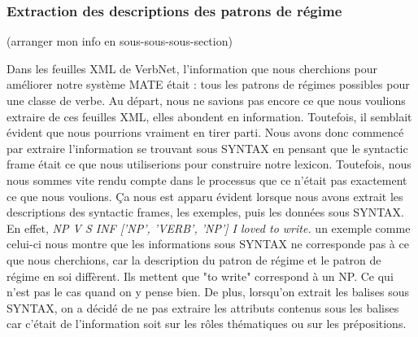 \documentclass[12pt,maitrise,frenchb,natbib,twoside,initial]{dms}
\numberwithin{equation}{section}
\numberwithin{table}{chapter}
\numberwithin{figure}{chapter}
\begin{document}
\subsubsection{Extraction des descriptions des  patrons de régime}

(arranger mon info en sous-sous-sous-section)

Dans les feuilles XML de VerbNet, l'information que nous cherchions pour améliorer notre système MATE était : tous les patrons de régimes possibles pour une classe de verbe. Au départ, nous ne savions pas encore ce que nous voulions extraire de ces feuilles XML, elles abondent en information. Toutefois, il semblait évident que nous pourrions vraiment en tirer parti. Nous avons donc commencé par extraire l'information se trouvant sous SYNTAX en pensant que le syntactic frame était ce que nous utiliserions pour construire notre lexicon. Toutefois, nous nous sommes vite rendu compte dans le processus que ce n'était pas exactement ce que  nous voulions. Ça nous est apparu évident lorsque nous avons extrait les descriptions des syntactic frames, les exemples, puis les données sous SYNTAX. En effet, \emph{ NP V S INF ['NP', 'VERB', 'NP'] I loved to write.} un exemple comme celui-ci nous montre que les informations sous SYNTAX ne corresponde pas à ce que nous cherchions, car la description du patron de régime et le patron de régime en soi diffèrent. Ils mettent que "to write" correspond à un NP. Ce qui n'est pas le cas quand on y pense bien. De plus, lorsqu'on extrait les balises sous SYNTAX, on a décidé de ne pas extraire les attributs contenus sous les balises car c'était de l'information soit sur les rôles thématiques ou sur les prépositions. 
\end{document}
